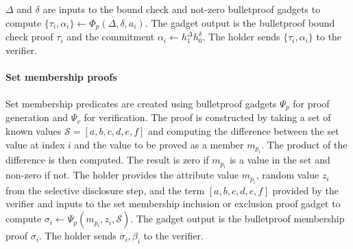 \documentclass[a4paper]{article}
\begin{document}
$\Delta$ and $\delta$ are inputs to the bound check and not-zero bulletproof gadgets to compute
$\{\tau_i, \alpha_i\} \leftarrow \Phi_p(\Delta, \delta, a_i)$.
The gadget output is the bulletproof bound check proof $\tau_i$ and the commitment $\alpha_i\leftarrow h_1^{\Delta}h_0^{\delta}$.
The holder sends $\{\tau_i, \alpha_i\}$ to the verifier.\\\\
\textbf{Set membership proofs}\\\\
Set membership predicates are created using bulletproof gadgets $\Psi_p$ for proof generation and
$\Psi_v$ for verification.
The proof is constructed by taking a set of known values $\mathcal{S} = [a, b, c, d, e, f]$ and
computing the difference between the set value at index $i$ and the value to be proved as a member $m_{p_i}$.
The product of the difference is then computed.
The result is zero if $m_{p_i}$ is a value in the set and non-zero if not.
The holder provides the attribute value $m_{p_i}$, random value $z_i$ from the selective disclosure
step, and the term $[a, b, c, d, e, f]$ provided by the verifier and inputs to the set membership
inclusion or exclusion proof gadget to compute $\sigma_i\leftarrow \Psi_p(m_{p_i}, z_i, \mathcal{S})$.
The gadget output is the bulletproof membership proof $\sigma_i$.
The holder sends $\sigma_i, \beta_i$ to the verifier.
\end{document}

